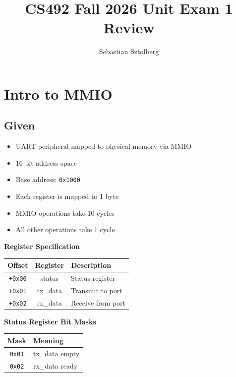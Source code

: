 \documentclass[14pt, a4paper]{article}
\title{CS492 Fall 2026 Unit Exam 1 Review}
\author{Sebastian Sztolberg}
\begin{document}
\maketitle

\section{Intro to MMIO}

\subsection*{Given}

\begin{itemize}
    \item UART peripheral mapped to physical memory via MMIO
    \item 16-bit address-space
    \item Base address: \texttt{0x1000}
    \item Each register is mapped to 1 byte
    \item MMIO operations take 10 cycles
    \item All other operations take 1 cycle
\end{itemize}

\vspace{3mm}

\noindent
\textbf{Register Specification}

\begin{center}
\begin{tabular}{c|c|l}
    \textbf{Offset} & \textbf{Register} & \textbf{Description} \\
    \hline
    \texttt{+0x00} & status & Status register \\
    \texttt{+0x01} & tx\_data & Transmit to port \\
    \texttt{+0x02} & rx\_data & Receive from port
\end{tabular}
\end{center}

\vspace{3mm}

\noindent
\textbf{Status Register Bit Masks}

\begin{center}
\begin{tabular}{c|l}
    \textbf{Mask} & \textbf{Meaning} \\
    \hline
    \texttt{0x01} & tx\_data empty \\
    \texttt{0x02} & rx\_data ready
\end{tabular}
\end{center}
\end{document}
